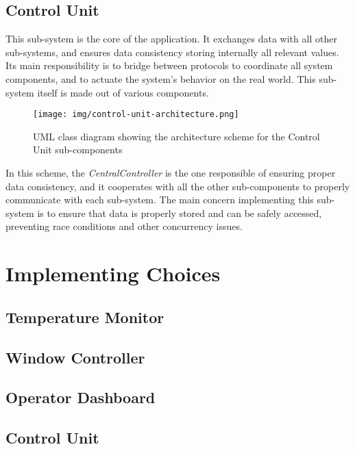 \documentclass[a4paper,12pt]{report}
\begin{document}
	\section{Control Unit}
	This sub-system is the core of the application. It exchanges data with all other sub-systems, and ensures data consistency storing internally all relevant values. Its main responsibility is to bridge between protocols to coordinate all system components, and to actuate the system's behavior on the real world.
	\newline This sub-system itself is made out of various components.
	\begin{figure}[H]
		\centering{}
		\texttt{[image: img/control-unit-architecture.png]}
		\caption{UML class diagram showing the architecture scheme for the Control Unit sub-components}
		\label{img:control-unit-architecture}
	\end{figure}
	In this scheme, the \textit{CentralController} is the one responsible of ensuring proper data consistency, and it cooperates with all the other sub-components to properly communicate with each sub-system.
	\newline The main concern implementing this sub-system is to ensure that data is properly stored and can be safely accessed, preventing race conditions and other concurrency issues.
	
	\chapter{Implementing Choices}
	\section{Temperature Monitor}
	\section{Window Controller}
	\section{Operator Dashboard}
	\section{Control Unit}
	
\end{document}
